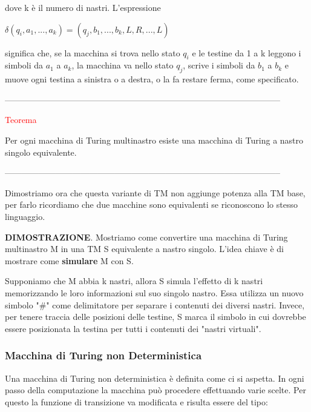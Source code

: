 \documentclass{article}
\begin{document}
dove k è il numero di nastri. L'espressione

\begin{center}
    $\delta(q_i, a_1, ..., a_k) = (q_j, b_1, ..., b_k, L, R, ..., L)$ 
\end{center}

significa che, se la macchina si trova nello stato $q_i$ e le testine da 1 a k
leggono i simboli da $a_1$ a $a_k$, la macchina va nello stato $q_j$, scrive i
simboli da $b_1$ a $b_k$ e muove ogni testina a sinistra o a destra, o la fa
restare ferma, come specificato.

\newpage

--------------------------------------------------------------------------------------------------

\begin{center}
    \textcolor{red}{Teorema}
\end{center}

Per ogni macchina di Turing multinastro esiste una macchina di Turing a nastro
singolo equivalente.

--------------------------------------------------------------------------------------------------

Dimostriamo ora che questa variante di TM non aggiunge potenza alla TM base, per
farlo ricordiamo che due macchine sono equivalenti se riconoscono lo stesso
linguaggio.

\textbf{DIMOSTRAZIONE}. Mostriamo come convertire una macchina di Turing
multinastro M in una TM S equivalente a nastro singolo. L'idea chiave è di
mostrare come \textbf{simulare} M con S.

Supponiamo che M abbia k nastri, allora S simula l'effetto di k nastri
memorizzando le loro informazioni sul suo singolo nastro. Essa utilizza un nuovo
simbolo "\#" come delimitatore per separare i contenuti dei diversi nastri.
Invece, per tenere traccia delle posizioni delle testine, S marca il simbolo in
cui dovrebbe essere posizionata la testina per tutti i contenuti dei "nastri
virtuali".

\subsubsection{Macchina di Turing non Deterministica}

Una macchina di Turing non deterministica è definita come ci si aspetta. In ogni
passo della computazione la macchina può procedere effettuando varie scelte. Per
questo la funzione di transizione va modificata e risulta essere del tipo:
\end{document}
